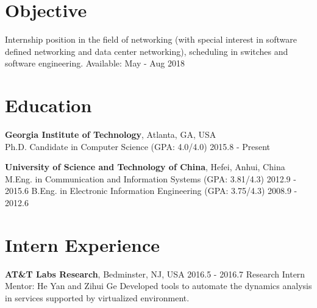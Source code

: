 \documentclass[line,11pt,letter]{/Users/longgong/Dropbox/git-reps/easy_cv/includes/cls/myRes}
\begin{document}

\address{266 Ferst Dr, Atlanta, GA 30332, United States}
\address{Cell: +1(404)697-0608. \hspace{5pt} Email: gonglong@gatech.}
\begin{resume}


\vspace*{-10pt}
\vspace*{-15pt}
\section{Objective}
\vspace{-4pt}
{\setlength{\parskip}{0pt}
 {Internship position in the field of networking (with special interest in software defined networking and data center networking), scheduling in switches and software engineering. \hfill{Available: May - Aug 2018}\break}
}%
\negspace
\section{Education}
\vspace{-4pt}
{\setlength{\parskip}{0pt}
\textbf{Georgia Institute of Technology}, Atlanta, GA, USA\\
{\hspace*{1em} Ph.D. Candidate in Computer Science (GPA: 4.0/4.0) \hspace{52.5pt} \hfill 2015.8 - Present\break}
}
\sspace

{\setlength{\parskip}{0pt}
\textbf{University of Science and Technology of China}, Hefei, Anhui, China\\
{\hspace*{1em} M.Eng. in Communication and Information Systems (GPA: 3.81/4.3) \hspace{52.5pt} \hfill 2012.9 - 2015.6\break}
{\hspace*{1em} B.Eng. in Electronic Information Engineering (GPA: 3.75/4.3) \hspace{52.5pt} \hfill 2008.9 - 2012.6\break}
}
\negspace
\section{Intern Experience}
\vspace{-4pt}
{\setlength{\parskip}{0pt}
{\bf AT\&T Labs Research}, Bedminster, NJ, USA \hfill 2016.5 - 2016.7\break
{\hspace*{1em} Research Intern \hfill Mentor: He Yan and Zihui Ge\break}
{\hspace*{1em} Developed tools to automate the dynamics analysis in services supported by virtualized environment.\break}
}\negspace

\end{resume}
\end{document}
